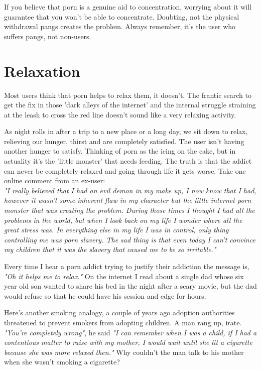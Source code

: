 \documentclass[easypeasy.tex]{subfiles}
\begin{document}
If you believe that porn is a genuine aid to concentration, worrying about it will guarantee that you won't be able to concentrate. Doubting, not the physical withdrawal pangs creates the problem. Always remember, it's the user who suffers pangs, not non-users.

\section{Relaxation}

Most users think that porn helps to relax them, it doesn't. The frantic search to get the fix in those 'dark alleys of the internet' and the internal struggle straining at the leash to cross the red line doesn't sound like a very relaxing activity.

As night rolls in after a trip to a new place or a long day, we sit down to relax, relieving our hunger, thirst and are completely satisfied. The user isn't having another hunger to satisfy. Thinking of porn as the icing on the cake, but in actuality it's the 'little monster' that needs feeding. The truth is that the addict can never be completely relaxed and going through life it gets worse. Take one online comment from an ex-user: \\
  \textit{"I really believed that I had an evil demon in my make up, I now know that I had, however it wasn't some inherent flaw in my character but the little internet porn monster that was creating the problem. During those times I thought I had all the problems in the world, but when I look back on my life I wonder where all the great stress was. In everything else in my life I was in control, only thing controlling me was porn slavery. The sad thing is that even today I can't convince my children that it was the slavery that caused me to be so irritable."}

Every time I hear a porn addict trying to justify their addiction the message is, \textit{"Oh it helps me to relax."} On the internet I read about a single dad whose six year old son wanted to share his bed in the night after a scary movie, but the dad would refuse so that he could have his session and edge for hours.

Here's another smoking analogy, a couple of years ago adoption authorities threatened to prevent smokers from adopting children. A man rang up, irate. \textit{"You're completely wrong"}, he said \textit{"I can remember when I was a child, if I had a contentious matter to raise with my mother, I would wait until she lit a cigarette because she was more relaxed then."} Why couldn't the man talk to his mother when she wasn't smoking a cigarette?
\end{document}
